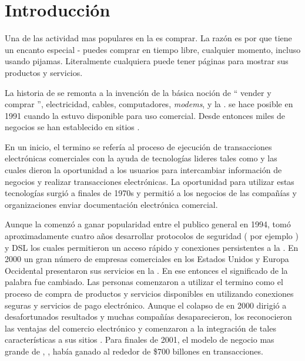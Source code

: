 \chapter{Introducción}\label{cap:intro}


Una de las actividad mas populares en la \web es comprar. La razón es por que tiene un encanto especial - puedes comprar en tiempo libre, cualquier momento, incluso usando pijamas. Literalmente cualquiera puede tener páginas para mostrar sus productos y servicios.

La historia de \ecommerce se remonta a la invención de la básica noción de “ vender y comprar ”, electricidad, cables, computadores, \textit{modems}, y la \internet. \ecommerce se hace posible en 1991 cuando la \internet estuvo disponible para uso comercial. Desde entonces miles de negocios se han establecido en sitios \web.

En un inicio, el termino \ecommerce se refería al proceso de ejecución  de transacciones electrónicas comerciales con la ayuda de tecnologías lideres tales como \edimeaning y \eftmeaning las cuales dieron la oportunidad a los usuarios para intercambiar información de negocios y realizar transacciones electrónicas. La oportunidad para utilizar estas tecnologías surgió a finales de 1970s y permitió a los negocios de las compañías y organizaciones enviar documentación electrónica comercial.

Aunque la \internet comenzó a ganar popularidad  entre el publico general en 1994, tomó aproximadamente cuatro años desarrollar protocolos de seguridad ( por ejemplo \http) y DSL los cuales permitieron un acceso rápido y conexiones persistentes a la \internet. En 2000 un gran número de empresas comerciales en los Estados Unidos y Europa Occidental presentaron sus servicios en la \www. En ese entonces el significado de la palabra \ecommerce fue cambiado. Las personas comenzaron a utilizar el termino \ecommerce como el proceso de compra de productos y servicios disponibles en \internet utilizando conexiones seguras y servicios de pago electrónico. Aunque el colapso de \dotcom en 2000 dirigió a desafortunados resultados y muchas compañías \ecommerce desaparecieron, los \retailers \brickandmortar reconocieron las ventajas del comercio electrónico y comenzaron a la integración de tales características a sus sitios \web. Para finales de 2001, el modelo de negocio mas grande de \ecommerce, \btob, había ganado al rededor de \$700 billones en transacciones.

